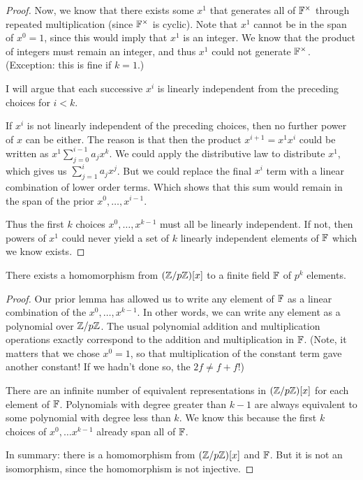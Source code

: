 \begin{proof}
  Now, we know that there exists some $x^1$ that generates all of
  $\mathbb{F}^\times$ through repeated multiplication (since $\mathbb{F}^\times$ is
  cyclic). Note that $x^1$ cannot be in the span of $x^0 = 1$, since
  this would imply that $x^1$ is an integer. We know that the product of
  integers must remain an integer, and thus $x^1$ could not generate
  $\mathbb{F}^\times$. (Exception: this is fine if $k = 1$.)

  I will argue that each successive $x^i$ is linearly independent from
  the preceding choices for $i < k$.

  If $x^i$ is not linearly independent of the preceding choices, then no
  further power of $x$ can be either. The reason is that then the
  product $x^{i+1} = x^1 x^i$ could be written as $x^1 \sum_{j = 0}^{i -
  1} a_j x^k$. We could apply the distributive law to distribute $x^1$,
  which gives us $\sum_{j=1}^{i} a_j x^j$. But we could replace the
  final $x^i$ term with a linear combination of lower order terms. Which
  shows that this sum would remain in the span of the prior $x^0,
  \ldots, x^{i - 1}$.

  Thus the first $k$ choices $x^0, \ldots, x^{k - 1}$ must all be
  linearly independent. If not, then powers of $x^1$ could never yield a
  set of $k$ linearly independent elements of $\mathbb{F}$ which we know exists.
\end{proof}

\begin{lemma}
  There exists a homomorphism from $\mathopen{}\left( {\mathbb{Z} / p\mathbb{Z}} \right)\mathclose{}[x]$ to a finite
  field $\mathbb{F}$ of $p^k$ elements.
\end{lemma}

\begin{proof}
  Our prior lemma has allowed us to write any element of $\mathbb{F}$ as a
  linear combination of the $x^0, \ldots, x^{k-1}$. In other words, we
  can write any element as a polynomial over $\mathbb{Z} / p\mathbb{Z}$. The usual
  polynomial addition and multiplication operations exactly correspond
  to the addition and multiplication in $\mathbb{F}$. (Note, it matters that we
  chose $x^0 = 1$, so that multiplication of the constant term gave
  another constant! If we hadn't done so, the $2f \ne f + f$!)

  There are an infinite number of equivalent representations in
  $\mathopen{}\left( {\mathbb{Z} / p\mathbb{Z}} \right)\mathclose{}[x]$ for each element of $\mathbb{F}$. Polynomials with degree
  greater than $k-1$ are always equivalent to some polynomial with
  degree less than $k$. We know this because the first $k$ choices of
  $x^0, \ldots x^{k-1}$ already span all of $\mathbb{F}$.

  In summary: there is a homomorphism from $\mathopen{}\left( {\mathbb{Z} / p\mathbb{Z}} \right)\mathclose{}[x]$ and
  $\mathbb{F}$. But it is not an isomorphism, since the homomorphism is not
  injective.
\end{proof}

